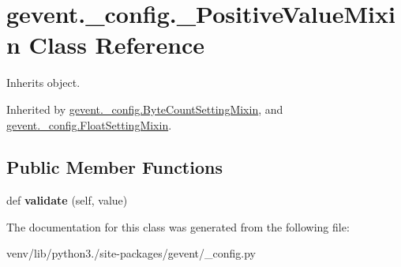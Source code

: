 \hypertarget{classgevent_1_1__config_1_1___positive_value_mixin}{}\section{gevent.\+\_\+config.\+\_\+\+Positive\+Value\+Mixin Class Reference}
\label{classgevent_1_1__config_1_1___positive_value_mixin}


Inherits object.



Inherited by \hyperlink{classgevent_1_1__config_1_1_byte_count_setting_mixin}{gevent.\+\_\+config.\+Byte\+Count\+Setting\+Mixin}, and \hyperlink{classgevent_1_1__config_1_1_float_setting_mixin}{gevent.\+\_\+config.\+Float\+Setting\+Mixin}.

\subsection*{Public Member Functions}
\begin{DoxyCompactItemize}
\item 
\mbox{\label{classgevent_1_1__config_1_1___positive_value_mixin_a06d39b47226894edce355f401713a2fb}} 
def {\bfseries validate} (self, value)
\end{DoxyCompactItemize}


The documentation for this class was generated from the following file\+:\begin{DoxyCompactItemize}
\item 
venv/lib/python3./site-\/packages/gevent/\+\_\+config.\+py\end{DoxyCompactItemize}

